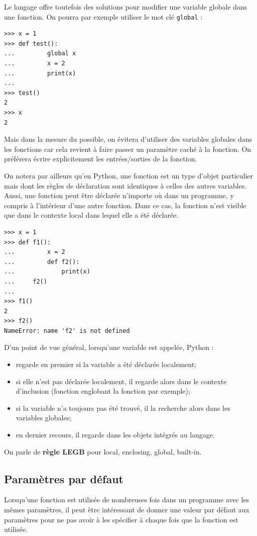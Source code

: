\documentclass[12pt, a4paper]{article}
\begin{document}
Le langage offre toutefois des solutions pour modifier une variable globale dans une fonction. On pourra par exemple utiliser le mot clé \lstinline{global} :
\begin{lstlisting}
>>> x = 1
>>> def test():
...			global x
...			x = 2
... 		print(x)
...
>>> test()
2
>>> x
2
\end{lstlisting}

Mais dans la mesure du possible, on évitera d'utiliser des variables globales dans les fonctions car cela revient à faire passer un paramètre caché à la fonction. On préférera écrire explicitement les entrées/sorties de la fonction.

On notera par ailleurs qu'en Python, une fonction est un type d'objet particulier mais dont les règles de déclaration sont identiques à celles des autres variables. Aussi, une fonction peut être déclarée n'importe où dans un programme, y compris à l'intérieur d'une autre fonction. Dans ce cas, la fonction n'est visible que dans le contexte local dans lequel elle a été déclarée.
\begin{lstlisting}
>>> x = 1
>>> def f1():
...			x = 2
...			def f2():
... 		    print(x)
...     f2()
...
>>> f1()
2
>>> f2()
NameError: name 'f2' is not defined
\end{lstlisting}

D'un point de vue général, lorsqu'une variable est appelée, Python :
\begin{itemize}
	\item regarde en premier si la variable a été déclarée localement;
	\item si elle n'est pas déclarée localement, il regarde alors dans le contexte d'inclusion (fonction englobant la fonction par exemple);
	\item si la variable n'a toujours pas été trouvé, il la recherche alors dans les variables globales;
	\item en dernier recours, il regarde dans les objets intégrés au langage.
\end{itemize}

On parle de \textbf{règle LEGB} pour local, enclosing, global, built-in.


\subsection{Paramètres par défaut}
Lorsqu'une fonction est utilisée de nombreuses fois dans un programme avec les mêmes paramètres, il peut être intéressant de donner une valeur par défaut aux paramètres pour ne pas avoir à les spécifier à chaque fois que la fonction est utilisée.
\end{document}
